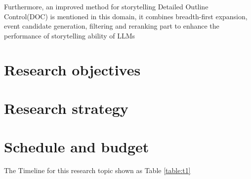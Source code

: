 \documentclass[10pt]{article}
\begin{document}
\begin{multicols}{2}
Furthermore, an improved method for storytelling Detailed Outline Control(DOC) is mentioned in this domain, it combines breadth-first expansion, event candidate generation, filtering and reranking part to enhance the performance of storytelling ability of LLMs\cite{yang-etal-2023-doc}


\section{Research objectives} 




\section{Research strategy}


\section{Schedule and budget}

The Timeline for this research topic shown as Table \ref{table:t1}


\end{multicols}
\end{document}
